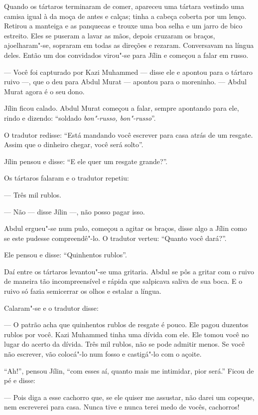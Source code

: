 Quando os tártaros terminaram de comer, apareceu uma tártara vestindo
uma camisa igual à da moça de antes e calças; tinha a cabeça coberta por
um lenço. Retirou a manteiga e as panquecas e trouxe uma boa selha e um
jarro de bico estreito. Eles se puseram a lavar as mãos, depois cruzaram
os braços, ajoelharam"-se, sopraram em todas as direções e rezaram.
Conversavam na língua deles. Então um dos convidados virou"-se para Jílin
e começou a falar em russo.

--- Você foi capturado por Kazi Muhammed --- disse ele e apontou para o
tártaro ruivo ---, que o deu para Abdul Murat --- apontou para o
moreninho. --- Abdul Murat agora é o seu dono.

Jílin ficou calado. Abdul Murat começou a falar, sempre apontando para ele, rindo e dizendo: ``soldado \emph{bon"-russo, bon"-russo}''.

O tradutor redisse: ``Está mandando você escrever para casa atrás de um
resgate. Assim que o dinheiro chegar, você será solto''.

Jílin pensou e disse: ``E ele quer um resgate grande?''.

Os tártaros falaram e o tradutor repetiu:

--- Três mil rublos.

--- Não --- disse Jílin ---, não posso pagar isso.

Abdul ergueu"-se num pulo, começou a agitar os braços, disse algo a Jílin
como se este pudesse compreendê"-lo. O tradutor verteu: ``Quanto você
dará?''.

Ele pensou e disse: ``Quinhentos rublos''.

Daí entre os tártaros levantou"-se uma gritaria. Abdul se pôs a gritar com
o ruivo de maneira tão incompreensível e rápida que salpicava saliva de
sua boca. E o ruivo só fazia semicerrar os olhos e estalar a língua.

Calaram"-se e o tradutor disse:

--- O patrão acha que quinhentos rublos de resgate é pouco. Ele pagou
duzentos rublos por você. Kazi Muhammed tinha uma dívida com ele. Ele
tomou você no lugar do acerto da dívida. Três mil rublos, não se pode
admitir menos. Se você não escrever, vão colocá"-lo num fosso e
castigá"-lo com o açoite.

``Ah!'', pensou Jílin, ``com esses aí, quanto mais me intimidar, pior
será.'' Ficou de pé e disse:

--- Pois diga a esse cachorro que, se ele quiser me assustar, não darei
um copeque, nem escreverei para casa. Nunca tive e nunca terei medo de
vocês, cachorros!


